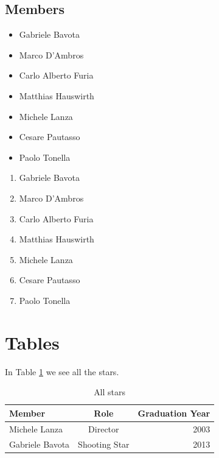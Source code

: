 \subsection{Members}

\begin{itemize}

\item Gabriele Bavota
\item Marco D'Ambros
\item Carlo Alberto Furia
\item Matthias Hauswirth
\item Michele Lanza
\item Cesare Pautasso
\item Paolo Tonella

\end{itemize}

\begin{enumerate}

\item Gabriele Bavota
\item Marco D'Ambros
\item Carlo Alberto Furia
\item Matthias Hauswirth
\item Michele Lanza \cite{Lanz2006a}
\item Cesare Pautasso
\item Paolo Tonella

\end{enumerate}

\section{Tables}

In Table \ref{tab-allstars} we see all the stars.

\begin{table}[ht]
\centering
\begin{tabular}{lcr} \hline
{\bf Member} & {\bf Role} & {\bf Graduation Year}\\ \hline
Michele Lanza & Director & 2003\\
Gabriele Bavota & Shooting Star & 2013\\ \hline
\end{tabular}
\caption{All stars}
\label{tab-allstars}
\end{table}